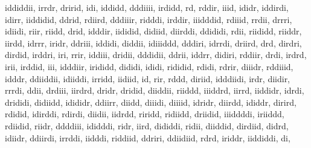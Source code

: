 \documentclass{article}
\begin{document}
iddiddii, irrdr, dririd, idi, iddidd, dddiiii, irdidd, rd, rddir, iiid, ididr, 
iddirdi, idirr, iiddidid, ddrid, rdiird, dddiiir, ridddi, irddir, iiidddid, 
rdiiid, rrdii, drrri, idiidi, riir, riidd, drid, idddir, iididid, didiid, 
diirddi, ddididi, rdii, riididd, riiddr, iirdd, idrrr, iridr, ddriii, iddidi, 
diddii, idiiiddd, dddiri, idrrdi, driird, drd, dirdri, dirdid, irddri, iri, 
rrir, iddiii, dridii, dddidii, ddrii, iddrr, didiri, rddiir, drdi, irdrd, irii, 
irddid, iii, idddiir, irididd, dididi, ididi, rididid, rdidi, rdrir, diiidr, 
rddiiid, idddr, ddiiddii, idiiddi, irridd, iidiid, id, rir, rddd, diriid, 
idddiidi, irdr, diidir, rrrdi, ddii, drdiii, iirdrd, dridr, dridid, diiddii, 
riiddd, iiiddrd, iirrd, iiddidr, idrdi, drididi, didiidd, idididr, ddiirr, 
diidd, diiidi, diiiid, idridr, diirdd, ididdr, dirird, rdidid, idirddi, rdirdi, 
diidii, iidrdd, riridd, ridiidd, driidid, iiiddddi, iriiddd, rdiidid, riidr, 
ddddiii, ididddi, ridr, iird, dididdi, ridii, diiddid, dirdiid, didrd, idiidr, 
ddiirdi, irrddi, iidddi, riddiid, ddriri, ddiidiid, rdrd, iriddr, iiddiddi, di, 
\end{document}
